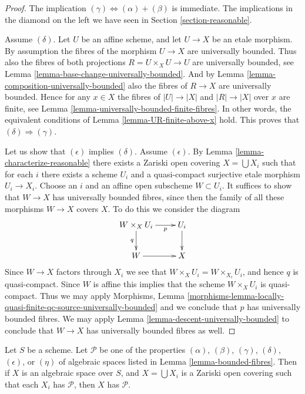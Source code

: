 \begin{proof}
The implication $(\gamma) \Leftrightarrow (\alpha) + (\beta)$ is immediate.
The implications in the diamond on the left we have seen in
Section \ref{section-reasonable}.

\medskip\noindent
Assume $(\delta)$. Let $U$ be an affine scheme, and let $U \to X$ be an etale
morphism. By assumption the fibres of the morphism $U \to X$ are universally
bounded. Thus also the fibres of both projections $R = U \times_X U \to U$
are universally bounded, see
Lemma \ref{lemma-base-change-universally-bounded}.
And by Lemma \ref{lemma-composition-universally-bounded} also
the fibres of $R \to X$ are universally bounded.
Hence for any $x \in X$ the fibres of $|U| \to |X|$ and $|R| \to |X|$
over $x$ are finite, see Lemma \ref{lemma-universally-bounded-finite-fibres}.
In other words, the equivalent conditions of
Lemma \ref{lemma-UR-finite-above-x}
hold. This proves that $(\delta) \Rightarrow (\gamma)$.

\medskip\noindent
Let us show that $(\epsilon)$ implies $(\delta)$.
Assume $(\epsilon)$. By Lemma \ref{lemma-characterize-reasonable} there exists
a Zariski open covering $X = \bigcup X_i$ such that for each $i$
there exists a scheme $U_i$ and a quasi-compact surjective etale morphism
$U_i \to X_i$. Choose an $i$ and an affine open subscheme $W \subset U_i$.
It suffices to show that $W \to X$ has universally bounded fibres, since then
the family of all these morphisms $W \to X$ covers $X$.
To do this we consider the diagram
$$
\xymatrix{
W \times_X U_i \ar[r]_-p \ar[d]_q & U_i \ar[d] \\
W \ar[r] & X
}
$$
Since $W \to X$ factors through $X_i$ we see that
$W \times_X U_i = W \times_{X_i} U_i$, and hence $q$ is quasi-compact.
Since $W$ is affine this implies that the scheme $W \times_X U_i$
is quasi-compact. Thus we may apply
Morphisms, Lemma
\ref{morphisms-lemma-locally-quasi-finite-qc-source-universally-bounded}
and we conclude that $p$ has universally bounded fibres.
We may apply
Lemma \ref{lemma-descent-universally-bounded}
to conclude that $W \to X$ has universally bounded fibres as well.
\end{proof}

\begin{lemma}
\label{lemma-properties-local}
Let $S$ be a scheme.
Let $\mathcal{P}$ be one of the properties
$(\alpha)$, $(\beta)$, $(\gamma)$, $(\delta)$, $(\epsilon)$, or
$(\eta)$ of algebraic spaces
listed in Lemma \ref{lemma-bounded-fibres}.
Then if $X$ is an algebraic space over $S$, and $X = \bigcup X_i$ is a
Zariski open covering such that each $X_i$ has $\mathcal{P}$,
then $X$ has $\mathcal{P}$.
\end{lemma}

